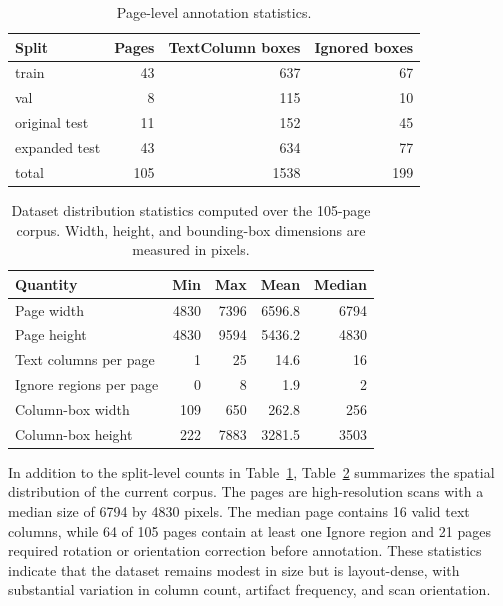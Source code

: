 \documentclass[pdflatex,sn-mathphys-num]{sn-jnl}
\begin{document}
\begin{table}[t]
\centering
\scriptsize\setlength{\tabcolsep}{3pt}
\caption{Page-level annotation statistics.}
\label{tab:data_stats}
\begin{tabular}{lrrr}
\toprule
Split & Pages & TextColumn boxes & Ignored boxes \\
\midrule
train & 43 & 637 & 67 \\
val & 8 & 115 & 10 \\
original test & 11 & 152 & 45 \\
expanded test & 43 & 634 & 77 \\
\midrule
total & 105 & 1538 & 199 \\
\bottomrule
\end{tabular}
\end{table}


\begin{table}[t]
\centering
\scriptsize\setlength{\tabcolsep}{3pt}
\caption{Dataset distribution statistics computed over the 105-page corpus. Width, height, and bounding-box dimensions are measured in pixels.}
\label{tab:dataset_distribution}
\begin{tabular}{lrrrr}
\toprule
Quantity & Min & Max & Mean & Median \\
\midrule
Page width & 4830 & 7396 & 6596.8 & 6794 \\
Page height & 4830 & 9594 & 5436.2 & 4830 \\
Text columns per page & 1 & 25 & 14.6 & 16 \\
Ignore regions per page & 0 & 8 & 1.9 & 2 \\
Column-box width & 109 & 650 & 262.8 & 256 \\
Column-box height & 222 & 7883 & 3281.5 & 3503 \\
\bottomrule
\end{tabular}
\end{table}

In addition to the split-level counts in Table~\ref{tab:data_stats}, Table~\ref{tab:dataset_distribution} summarizes the spatial distribution of the current corpus. The pages are high-resolution scans with a median size of 6794 by 4830 pixels. The median page contains 16 valid text columns, while 64 of 105 pages contain at least one Ignore region and 21 pages required rotation or orientation correction before annotation. These statistics indicate that the dataset remains modest in size but is layout-dense, with substantial variation in column count, artifact frequency, and scan orientation.
\end{document}
